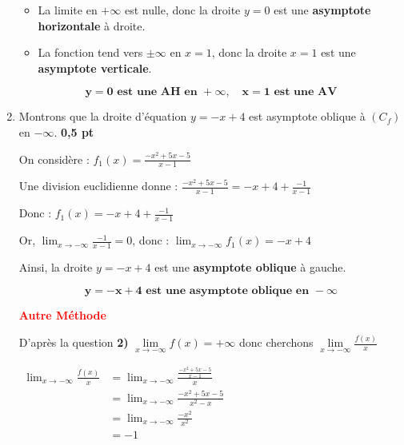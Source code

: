 \documentclass[12pt,a4paper]{article}
\begin{document}
\begin{enumerate}
    \begin{itemize}
    \item La limite en \( +\infty \) est nulle, donc la droite \( y = 0 \) est une \textbf{asymptote horizontale} à droite.
    \item La fonction tend vers \( \pm\infty \) en \( x = 1 \), donc la droite \( x = 1 \) est une \textbf{asymptote verticale}.
		\end{itemize}
		 \begin{resultbox}
    	\[
    	\mathbf{y = 0 \text{ est une AH en } +\infty, \quad x = 1 \text{ est une AV}}
    	\]
		\end{resultbox} 
    
    \item Montrons que la droite d’équation \( y = -x + 4 \) est asymptote oblique à \( (C_f) \) en \( -\infty \). \hfill \textbf{0{,}5 pt}
    
    On considère : \( f_1(x) = \frac{-x^2 + 5x - 5}{x - 1} \)

		Une division euclidienne donne : \( \frac{-x^2 + 5x - 5}{x - 1} = -x + 4 + \frac{-1}{x - 1} \)

		Donc : \( f_1(x) = -x + 4 + \frac{-1}{x - 1} \)


Or, \(\lim_{x \to -\infty} \frac{-1}{x - 1} = 0\), donc : \( \lim_{x \to -\infty} f_1(x) = -x + 4 \)

Ainsi, la droite \( y = -x + 4 \) est une \textbf{asymptote oblique} à gauche.

		 \begin{resultbox}
    	\[
    	\mathbf{y = -x + 4 \text{ est une asymptote oblique en } -\infty}
    	\]
		\end{resultbox} 

\textcolor{red}{ \textbf{Autre Méthode} }

D'après la question \textbf{2)} \( \lim\limits_{x\to -\infty} f(x) = +\infty \) donc cherchons \( \lim\limits_{x\to -\infty} \frac{f(x)}{x} \)

\(
\begin{aligned}
	\lim_{x \to -\infty} \frac{f(x)}{x} &= \lim_{x \to -\infty} \frac{\frac{-x^2 + 5x - 5}{x - 1}}{x}\\
														&= \lim_{x \to -\infty} \frac{-x^2 + 5x - 5}{x^{2} - x}\\
														&= \lim_{x \to -\infty} \frac{-x^2}{x^{2}}\\
														&= -1\\
\end{aligned}
\)    


\end{enumerate}
\end{document}
